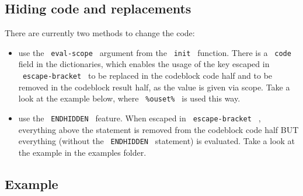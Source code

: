 \subsection{Hiding code and
replacements}\label{hiding-code-and-replacements}

There are currently two methods to change the code:

\begin{itemize}
\tightlist
\item
  use the \texttt{\ eval-scope\ } argument from the \texttt{\ init\ }
  function. There is a \texttt{\ code\ } field in the dictionaries,
  which enables the usage of the key escaped in
  \texttt{\ escape-bracket\ } to be replaced in the codeblock code half
  and to be removed in the codeblock result half, as the value is given
  via scope. Take a look at the example below, where
  \texttt{\ \%ouset\%\ } is used this way.
\item
  use the \texttt{\ ENDHIDDEN\ } feature. When escaped in
  \texttt{\ escape-bracket\ } , everything above the statement is
  removed from the codeblock code half BUT everything (without the
  \texttt{\ ENDHIDDEN\ } statement) is evaluated. Take a look at the
  example in the examples folder.
\end{itemize}

\subsection{Example}\label{example}

\begin{Shaded}
\begin{Highlighting}[]
\NormalTok{  )}
\NormalTok{))}

\NormalTok{$}
\NormalTok{$}
\NormalTok{\textasciigrave{}\textasciigrave{}\textasciigrave{}}
\NormalTok{\textasciigrave{}\textasciigrave{}\textasciigrave{}}
\end{Highlighting}
\end{Shaded}

